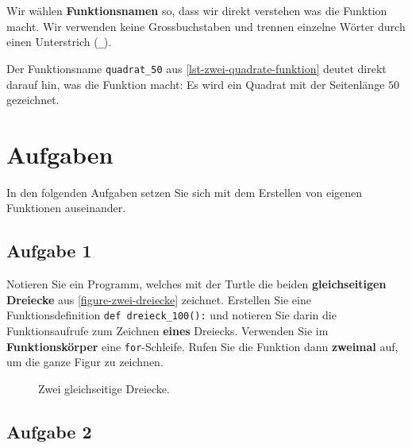 \begin{cleancode}
Wir wählen \textbf{Funktionsnamen} so, dass wir direkt verstehen was die Funktion macht. Wir verwenden keine Grossbuchstaben und trennen einzelne Wörter durch einen Unterstrich (\lstinline{_}).
\end{cleancode}

\begin{example}

Der Funktionsname \texttt{quadrat\_50} aus \autoref{lst-zwei-quadrate-funktion} deutet direkt darauf hin, was die Funktion macht: Es wird ein Quadrat mit der Seitenlänge $50$ gezeichnet.

\end{example}

\section{Aufgaben}

In den folgenden Aufgaben setzen Sie sich mit dem Erstellen von eigenen Funktionen auseinander.

\subsection{Aufgabe 1}

Notieren Sie ein Programm, welches mit der Turtle die beiden \textbf{gleichseitigen Dreiecke} aus \autoref{figure-zwei-dreiecke} zeichnet. Erstellen Sie eine Funktionsdefinition \lstinline{def dreieck_100():} und notieren Sie darin die Funktionsaufrufe zum Zeichnen \textbf{eines} Dreiecks. Verwenden Sie im \textbf{Funktionskörper} eine \lstinline{for}-Schleife. Rufen Sie die Funktion dann \textbf{zweimal} auf, um die ganze Figur zu zeichnen.

\begin{figure}[htb]
\centering
{}
\caption{Zwei gleichseitige Dreiecke.}
\label{figure-zwei-dreiecke}
\end{figure}

\fillwithgrid{3.5in}

\subsection{Aufgabe 2}

